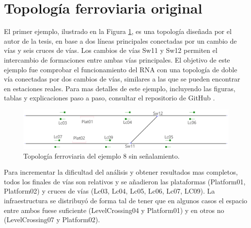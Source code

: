 \section{Topología ferroviaria original}

	El primer ejemplo, ilustrado en la Figura \ref{fig:EJ8_1}, es una topología diseñada por el autor de la tesis, en base a dos líneas principales conectadas por un cambio de vías y seis cruces de vías. Los cambios de vías Sw11 y Sw12 permiten el intercambio de formaciones entre ambas vías principales. El objetivo de este ejemplo fue comprobar el funcionamiento del RNA con una topología de doble vía conectadas por dos cambios de vías, similares a las que se pueden encontrar en estaciones reales. Para mas detalles de este ejemplo, incluyendo las figuras, tablas y explicaciones paso a paso, consultar el repositorio de GitHub \cite{GITHUB_PHD}.
	
	\begin{figure}[h]
		\centering
		\includegraphics[width=1\textwidth]{resultados-obtenidos/ejemplo8/images/8_empty.png}
		\centering\caption{Topología ferroviaria del ejemplo 8 sin señalamiento.}
		\label{fig:EJ8_1}
	\end{figure}
	
	Para incrementar la dificultad del análisis y obtener resultados mas completos, todos los finales de vías son relativos y se añadieron las plataformas (Platform01, Platform02) y cruces de vías (Lc03, Lc04, Lc05, Lc06, Lc07, LC09). La infraestructura se distribuyó de forma tal de tener que en algunos casos el espacio entre ambos fuese suficiente (LevelCrossing04 y Platform01) y en otros no (LevelCrossing07 y Platform02).
